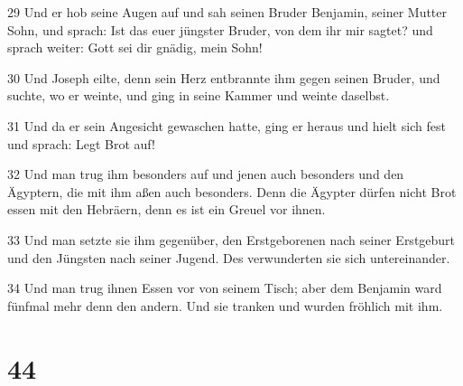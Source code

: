 \par 29 Und er hob seine Augen auf und sah seinen Bruder Benjamin, seiner Mutter Sohn, und sprach: Ist das euer jüngster Bruder, von dem ihr mir sagtet? und sprach weiter: Gott sei dir gnädig, mein Sohn!
\par 30 Und Joseph eilte, denn sein Herz entbrannte ihm gegen seinen Bruder, und suchte, wo er weinte, und ging in seine Kammer und weinte daselbst.
\par 31 Und da er sein Angesicht gewaschen hatte, ging er heraus und hielt sich fest und sprach: Legt Brot auf!
\par 32 Und man trug ihm besonders auf und jenen auch besonders und den Ägyptern, die mit ihm aßen auch besonders. Denn die Ägypter dürfen nicht Brot essen mit den Hebräern, denn es ist ein Greuel vor ihnen.
\par 33 Und man setzte sie ihm gegenüber, den Erstgeborenen nach seiner Erstgeburt und den Jüngsten nach seiner Jugend. Des verwunderten sie sich untereinander.
\par 34 Und man trug ihnen Essen vor von seinem Tisch; aber dem Benjamin ward fünfmal mehr denn den andern. Und sie tranken und wurden fröhlich mit ihm.

\chapter{44}

